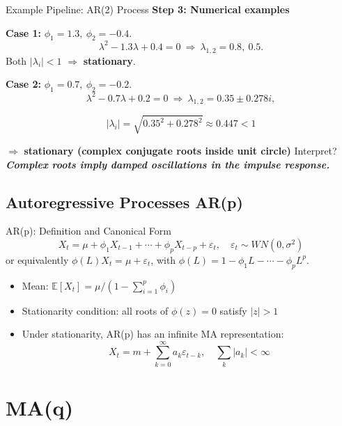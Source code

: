 \documentclass{beamer}
\begin{document}
\begin{frame}{Example Pipeline: AR(2) Process}
\smallskip
\textbf{Step 3: Numerical examples}

\textbf{Case 1:} $\phi_1=1.3,\ \phi_2=-0.4$.
\[
\lambda^2-1.3\lambda+0.4=0 \ \Rightarrow\ \lambda_{1,2}=0.8,\ 0.5.
\]
Both $|\lambda_i|<1$ $\Rightarrow$ \textbf{stationary}.


\textbf{Case 2:} $\phi_1=0.7,\ \phi_2=-0.2$.
\[
\lambda^2-0.7\lambda+0.2=0 \ \Rightarrow\ \lambda_{1,2}=0.35\pm0.278i,
\]

\[ |\lambda_i|=\sqrt{0.35^2+0.278^2}\approx 0.447<1\]

$\Rightarrow$ \textbf{stationary (complex conjugate roots inside unit circle)} Interpret?
\pause
\vspace{0.3em}
\textbf{\textit{Complex roots imply damped oscillations in the impulse response.}}
\end{frame}



\subsection{Autoregressive Processes AR(p)}

\begin{frame}{AR(p): Definition and Canonical Form}
\[
    X_t = \mu + \phi_1 X_{t-1} + \cdots + \phi_p X_{t-p} + \varepsilon_t, 
    \quad \varepsilon_t \sim WN(0,\sigma^2)
\]
or equivalently \( \phi(L) X_t = \mu + \varepsilon_t \), with \( \phi(L) = 1 - \phi_1 L - \cdots - \phi_p L^p \).

\begin{itemize}
    \item Mean: \( \mathbb{E}[X_t] = \mu / (1 - \sum_{i=1}^p \phi_i) \)
    \item Stationarity condition: all roots of \( \phi(z) = 0 \) satisfy \( |z| > 1 \)
    \item Under stationarity, AR(p) has an infinite MA representation:
    \[
        X_t = m + \sum_{k=0}^{\infty} a_k \varepsilon_{t-k}, 
        \quad \sum_k |a_k| < \infty
    \]
\end{itemize}

\end{frame}


\section{MA(q)}
\end{document}
